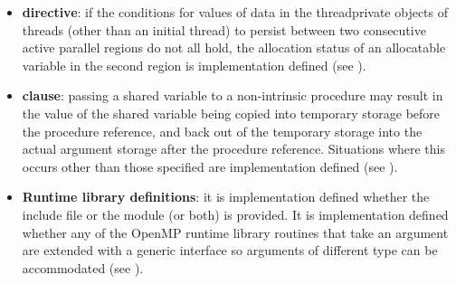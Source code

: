 \begin{itemize}
\fortranspecificstart

\item {} \textbf{directive}: if the conditions for values of data in the threadprivate 
objects of threads (other than an initial thread) to persist between two consecutive 
active parallel regions do not all hold, the allocation status of an allocatable variable 
in the second region is implementation defined (see ).

\item {} \textbf{clause}: passing a shared variable to a non-intrinsic procedure may result in 
the value of the shared variable being copied into temporary storage before the 
procedure reference, and back out of the temporary storage into the actual argument 
storage after the procedure reference. Situations where this occurs other than those 
specified are implementation defined (see ).

\item \textbf{Runtime library definitions}: it is implementation defined whether the include file 
 or the module  (or both) is provided. It is implementation 
defined whether any of the OpenMP runtime library routines that take an argument 
are extended with a generic interface so arguments of different  type can be 
accommodated (see ).

\fortranspecificend

\end{itemize}



